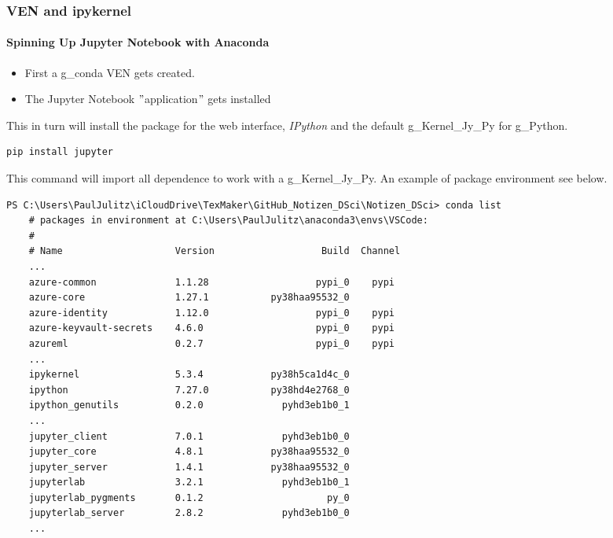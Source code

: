 \subsubsection{VEN and ipykernel}
\paragraph{Spinning Up Jupyter Notebook with Anaconda}
\begin{itemize}
	\item First a \gls{g_conda} \gls{VEN} gets created.
	\item The Jupyter Notebook $"$application$"$ gets installed
\end{itemize}
This in turn will install the package for the web interface, \textit{IPython} and the default \gls{g_Kernel_Jy_Py} for \gls{g_Python}.
\begin{lstlisting}[language=iCMD, caption={pip commands to get ready for Jupyter Notebok},captionpos=b]
	pip install jupyter
\end{lstlisting}
This command will import all dependence to work with a \gls{g_Kernel_Jy_Py}. An example of package environment see below.

\begin{lstlisting}[style=CMD, caption={Example Jupyter Notebook conda ven},captionpos=b]
	PS C:\Users\PaulJulitz\iCloudDrive\TexMaker\GitHub_Notizen_DSci\Notizen_DSci> conda list
	# packages in environment at C:\Users\PaulJulitz\anaconda3\envs\VSCode:
	#
	# Name                    Version                   Build  Channel     
	...
	azure-common              1.1.28                   pypi_0    pypi      
	azure-core                1.27.1           py38haa95532_0  
	azure-identity            1.12.0                   pypi_0    pypi      
	azure-keyvault-secrets    4.6.0                    pypi_0    pypi      
	azureml                   0.2.7                    pypi_0    pypi      
	...
	ipykernel                 5.3.4            py38h5ca1d4c_0
	ipython                   7.27.0           py38hd4e2768_0
	ipython_genutils          0.2.0              pyhd3eb1b0_1
	...
	jupyter_client            7.0.1              pyhd3eb1b0_0
	jupyter_core              4.8.1            py38haa95532_0
	jupyter_server            1.4.1            py38haa95532_0
	jupyterlab                3.2.1              pyhd3eb1b0_1
	jupyterlab_pygments       0.1.2                      py_0
	jupyterlab_server         2.8.2              pyhd3eb1b0_0
	...
\end{lstlisting}


